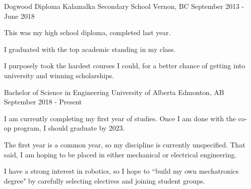 

\begin{cventries}

  \cventry
    {Dogwood Diploma} %
    {Kalamalka Secondary School} %
    {Vernon, BC} %
    {September 2013 - June 2018} %
    {
      \begin{cvitems} %
        \item {This was my high school diploma, completed last year.}
        \item {I graduated with the top academic standing in my class.}
        \item {I purposely took the hardest courses I could, for a better chance of getting into university and winning scholarships.}
      \end{cvitems}
    }

  \cventry
    {Bachelor of Science in Engineering}
    {University of Alberta}
    {Edmonton, AB}
    {September 2018 - Present}
    {
      \begin{cvitems}
        \item {I am currently completing my first year of studies. Once I am done with the co-op program, I should graduate by 2023.}
        \item {The first year is a common year, so my discipline is currently unspecified. That said, I am hoping to be placed in either mechanical or electrical engineering.}
        \item {I have a strong interest in robotics, so I hope to ``build my own mechatronics degree" by carefully selecting electives and joining student groups.}
      \end{cvitems}
    }

\end{cventries}
